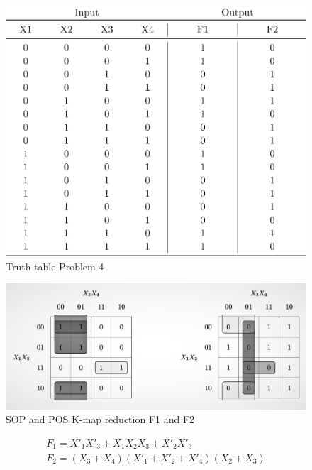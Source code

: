 \documentclass{article}
\begin{document}
\begin{figure}[H]
    \centering
    \includegraphics[scale=0.5,cframe=blue 0.5pt 3pt]{4TT.png}
    \caption{Truth table Problem 4}
\end{figure}



\begin{figure}[H]
    \centering
    \includegraphics[scale=0.5,cframe=blue 0.5pt 3pt]{4km.png}
    \caption{SOP and POS K-map reduction F1 and F2}
\end{figure}




\begin{align*}
    F_1=X'_1X'_3 + X_1X_2X_3 + X'_2X'_3 \\
    F_2=(X_3 + X_4) (X'_1+ X'_2 + X'_4) (X_2 + X_3)
\end{align*}

\end{document}
